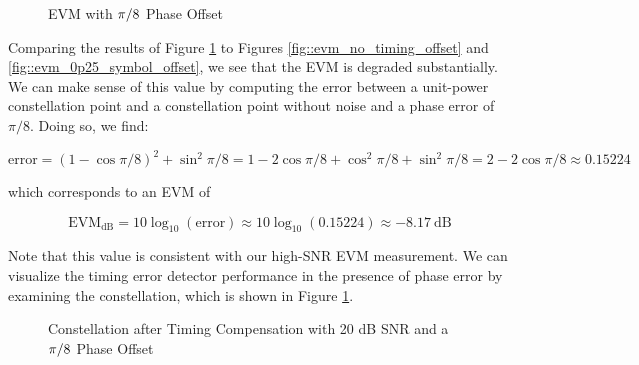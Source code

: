 \documentclass{article}
\begin{document}
\begin{figure}[H]
	\centerline{}
	\caption{EVM with $\protect\pi/8$ Phase Offset}
	\label{fig::evm_pi_8_phase_offset}
\end{figure}

Comparing the results of Figure \ref{fig::evm_pi_8_phase_offset} to Figures \ref{fig::evm_no_timing_offset} and \ref{fig::evm_0p25_symbol_offset}, we see that the EVM is degraded substantially. We can make sense of this value by computing the error between a unit-power constellation point and a constellation point without noise and a phase error of $\pi/8$. Doing so, we find:

\begin{equation}
	\text{error} = (1 - \cos\pi/8)^2 + \sin^2\pi/8 = 1 - 2\cos\pi/8 + \cos^2\pi/8 + \sin^2\pi/8 = 2 - 2\cos\pi/8 \approx 0.15224 
\end{equation}

\noindent which corresponds to an EVM of 

\begin{equation}
	\text{EVM}_{\text{dB}} = 10\log_{10}\left(\text{error}\right) \approx 10\log_{10}(0.15224) \approx -8.17\ \text{dB}
\end{equation}

\noindent Note that this value is consistent with our high-SNR EVM measurement. We can visualize the timing error detector performance in the presence of phase error by examining the constellation, which is shown in Figure \ref{fig::evm_pi_8_phase_offset}.

\begin{figure}[H]
	\centerline{}
	\caption{Constellation after Timing Compensation with 20 dB SNR and a $\protect\pi/8$ Phase Offset}
	\label{fig::constellation_phase_error}
\end{figure}
\end{document}
